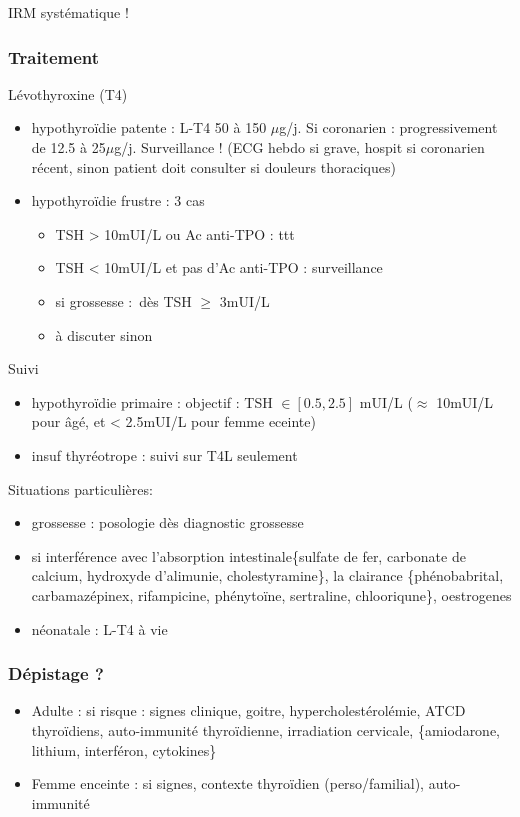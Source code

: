 \documentclass[11pt]{article}
\begin{document}
IRM systématique !

\subsubsection{Traitement}
\label{sec:org64a4a78}
Lévothyroxine (T4) 
\begin{itemize}
\item hypothyroïdie patente : L-T4 50 à 150 \(\mu\)g/j. Si coronarien : \inc progressivement
de 12.5 à 25\(\mu\)g/j. \danger Surveillance ! (ECG hebdo si grave, hospit si coronarien
récent, sinon patient doit consulter si douleurs thoraciques)
\item hypothyroïdie frustre : 3 cas
\begin{itemize}
\item TSH > 10mUI/L ou Ac anti-TPO : ttt
\item TSH < 10mUI/L et pas d'Ac anti-TPO : surveillance
\item si grossesse : dès TSH \(\ge\) 3mUI/L
\item à discuter sinon
\end{itemize}
\end{itemize}

Suivi
\begin{itemize}
\item hypothyroïdie primaire : objectif : TSH \(\in [0.5, 2.5]\) mUI/L (\(\approx\) 10mUI/L pour âgé, et < 2.5mUI/L pour femme eceinte)
\item insuf thyréotrope : suivi sur T4L seulement
\end{itemize}

Situations particulières:
\begin{itemize}
\item grossesse : \inc posologie dès diagnostic grossesse
\item \inc si interférence avec l'absorption intestinale\{sulfate de fer, carbonate de calcium, hydroxyde
d'alimunie, cholestyramine\}, la clairance \{phénobabrital, carbamazépinex, rifampicine,
phénytoïne, sertraline, chlooriqune\}, oestrogenes
\item néonatale : L-T4 à vie
\end{itemize}

\subsubsection{Dépistage ?}
\label{sec:orgb14f87a}
\begin{itemize}
\item Adulte : si risque : signes clinique, goitre, hypercholestérolémie, ATCD
thyroïdiens, auto-immunité thyroïdienne, irradiation cervicale, \{amiodarone,
lithium, interféron, cytokines\}
\item Femme enceinte : si signes, contexte thyroïdien (perso/familial), auto-immunité
\end{itemize}
\end{document}
